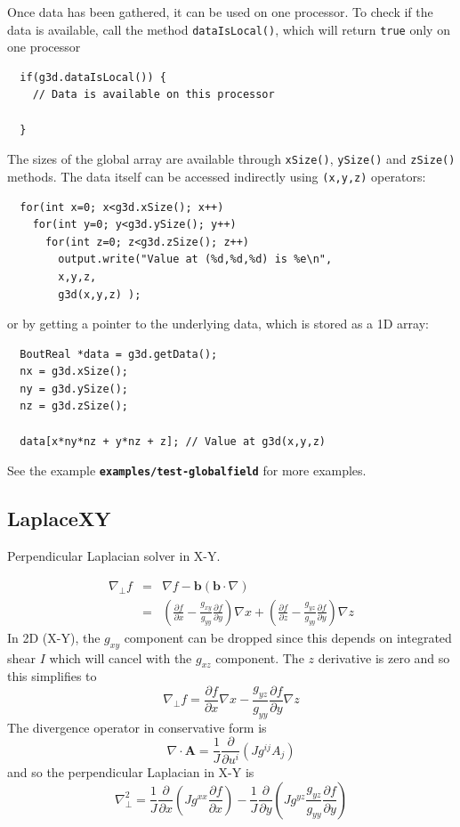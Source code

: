 \documentclass[12pt]{article}
\newcommand{\file}[1]{\texttt{\bf #1}}
\begin{document}
Once data has been gathered, it can be used on one processor. To check if the
data is available, call the method
%
\lstinline!dataIsLocal()!, which will return \lstinline!true!
%
 only on one processor
%
\begin{lstlisting}
  if(g3d.dataIsLocal()) {
    // Data is available on this processor

  }
\end{lstlisting}
%
The sizes of the global array are available through
%
\lstinline!xSize()!, \lstinline!ySize()! and \lstinline!zSize()!
%
methods. The data itself can be accessed indirectly using
%
\lstinline!(x,y,z)!
%
 operators:
%
\begin{lstlisting}
  for(int x=0; x<g3d.xSize(); x++)
    for(int y=0; y<g3d.ySize(); y++)
      for(int z=0; z<g3d.zSize(); z++)
        output.write("Value at (%d,%d,%d) is %e\n",
        x,y,z,
        g3d(x,y,z) );
\end{lstlisting}
%
or by getting a pointer to the underlying data, which is stored as a 1D array:
%
\begin{lstlisting}
  BoutReal *data = g3d.getData();
  nx = g3d.xSize();
  ny = g3d.ySize();
  nz = g3d.zSize();

  data[x*ny*nz + y*nz + z]; // Value at g3d(x,y,z)
\end{lstlisting}
%
See the example \file{examples/test-globalfield} for more examples.

\subsection{LaplaceXY}

Perpendicular Laplacian solver in X-Y.

\begin{eqnarray*}
\nabla_\perp f &=& \nabla f - \mathbf{b}\left(\mathbf{b}\cdot\nabla\right) \\
&=& \left(\frac{\partial f}{\partial x} - \frac{g_{xy}}{g_{yy}}\frac{\partial f}{\partial y}\right)\nabla x + \left(\frac{\partial f}{\partial z} - \frac{g_{yz}}{g_{yy}}\frac{\partial f}{\partial y}\right)\nabla z
\end{eqnarray*}
In 2D (X-Y), the $g_{xy}$ component can be dropped since this depends on integrated shear $I$ which will cancel with the $g_{xz}$ component. The $z$ derivative is zero and so this simplifies to 
\[
\nabla_\perp f = \frac{\partial f}{\partial x}\nabla x - \frac{g_{yz}}{g_{yy}}\frac{\partial f}{\partial y}\nabla z
\]
The divergence operator in conservative form is
\[
\nabla\cdot\mathbf{A} = \frac{1}{J}\frac{\partial}{\partial u^i}\left(Jg^{ij}A_j\right)
\]
and so the perpendicular Laplacian in X-Y is
\[
\nabla_\perp^2 = \frac{1}{J}\frac{\partial}{\partial x}\left(Jg^{xx}\frac{\partial f}{\partial x}\right) - \frac{1}{J}\frac{\partial}{\partial y}\left(Jg^{yz}\frac{g_{yz}}{g_{yy}}\frac{\partial f}{\partial y}\right)
\]
\end{document}
